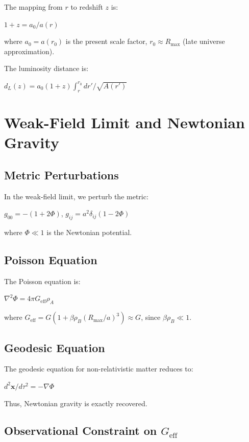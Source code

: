 \documentclass[10pt,twocolumn]{article}
\theoremstyle{definition}
\newcommand{\Rmax}{R_{\max}}
\newcommand{\rhoA}{\rho_{A}}
\newcommand{\rhoB}{\rho_{B}}
\begin{document}
The mapping from \( r \) to redshift \( z \) is:

$1 + z = a_{0} / a(r)$

where \( a_{0} = a(r_{0}) \) is the present scale factor, \( r_{0} \approx \Rmax \) (late universe approximation).

The luminosity distance is:

\( d_{L}(z) = a_{0} (1 + z) \int_{r}^{r_{0}} dr' / \sqrt{A(r')} \)

\section{Weak-Field Limit and Newtonian Gravity}
\label{sec:newtonian}

\subsection{Metric Perturbations}

In the weak-field limit, we perturb the metric:

\( g_{00} = - (1 + 2 \Phi) \), \( g_{ij} = a^{2} \delta_{ij} (1 - 2 \Phi) \)

where \( \Phi \ll 1 \) is the Newtonian potential.

\subsection{Poisson Equation}

The Poisson equation is:

\( \nabla^{2} \Phi = 4 \pi G_{\mathrm{eff}} \rhoA \)

where \( G_{\mathrm{eff}} = G (1 + \beta \rhoB (\Rmax / a)^{3}) \approx G \), since \( \beta \rhoB \ll 1 \).

\subsection{Geodesic Equation}

The geodesic equation for non-relativistic matter reduces to:

\( d^{2} \mathbf{x} / d\tau^{2} = - \nabla \Phi \)

Thus, Newtonian gravity is exactly recovered.

\subsection{Observational Constraint on \( G_{\mathrm{eff}} \)}
\end{document}
